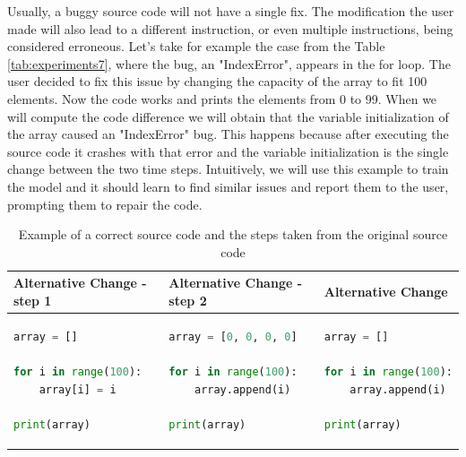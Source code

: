 \documentclass[12pt,a4paper]{report}
\begin{document}
Usually, a buggy source code will not have a single fix. The modification the user made will also lead to a different instruction, or even multiple instructions, being considered erroneous. Let's take for example the case from the Table \ref{tab:experiments7}, where the bug, an "IndexError", appears in the for loop. The user decided to fix this issue by changing the capacity of the array to fit 100 elements. Now the code works and prints the elements from 0 to 99. When we will compute the code difference we will obtain that the variable initialization of the array caused an "IndexError" bug. This happens because after executing the source code it crashes with that error and the variable initialization is the single change between the two time steps. Intuitively, we will use this example to train the model and it should learn to find similar issues and report them to the user, prompting them to repair the code.

\begin{table}[H]\small\linespread{1}
\centering
\caption{Example of a correct source code and the steps taken from the original source code}
\label{tab:experiments8}
\begin{tabular}{p{5cm} p{5cm} p{5cm}}
\textbf{Alternative Change - step 1} & \textbf{Alternative Change - step 2} & \textbf{Alternative Change} \\
\hline
\begin{lstlisting}[language=Python]
array = []

for i in range(100):
    array[i] = i

print(array)
\end{lstlisting} & \begin{lstlisting}[language=Python]
array = [0, 0, 0, 0]

for i in range(100):
    array.append(i)

print(array)
\end{lstlisting} & \begin{lstlisting}[language=Python]
array = []

for i in range(100):
    array.append(i)

print(array)
\end{lstlisting} \\
\end{tabular}
\end{table}
\end{document}
